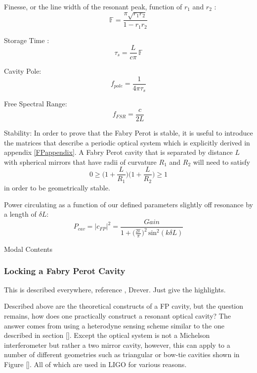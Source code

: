 		Finesse, or the line width of the resonant peak, function of $r_1$ and $r_2$      :
		\begin{equation}
		\mathbb{F} = \frac{\pi \sqrt{r_1 r_2}}{1- r_1 r_2}
		\end{equation}
		
		Storage Time :
		\begin{equation}
		\tau_{s} = \frac{L}{c \pi} \, \mathbb{F}
		\end{equation}
		
		Cavity Pole:
		\begin{equation}
		f_{pole} = \frac{1}{4\pi \tau_{s}}
		\end{equation}
	
		Free Spectral Range:
		\begin{equation}
		f_{FSR}  = \frac{c}{2L}
		\end{equation}
		
		Stability: In order to prove that the Fabry Perot is stable, it is useful to introduce the matrices that describe a periodic optical system which is explicitly derived in appendix \ref{FPappendix}.  A Fabry Perot cavity that is separated by distance $L$ with spherical mirrors that have radii of curvature $R_1$ and $R_2$ will need to satisfy 
		\begin{equation}\label{gfactor}
		0 \geq \bigg(1+\frac{L}{R_1}\bigg) \bigg(1+\frac{L}{R_2}\bigg) \geq 1
		\end{equation}
		in order to be geometrically stable.
		
		Power circulating as a function of our defined parameters slightly off resonance by a length of $\delta L$:
		\begin{equation}
		P_{cav} = \vert c_{FP} \vert^2 = \frac{Gain}{ 1 + \big(\frac{2\mathbb{F}}{\pi} \big)^2 \, \text{sin}^2(k \delta L) }
		\end{equation}
		
		Modal Contents
		
		\subsubsection{Locking a Fabry Perot Cavity}
		This is described everywhere, reference \cite{BlackPDH}, Drever. Just give the highlights.
		
		Described above are the theoretical constructs of a FP cavity, but the question remains, how does one practically construct a resonant optical cavity?  The answer comes from using a heterodyne sensing scheme similar to the one described in section [].  Except the optical system is not a Michelson interferometer but rather a two mirror cavity, however, this can apply to a number of different geometries such as triangular or bow-tie cavities shown in Figure [].  All of which are used in LIGO for various reasons.
		
